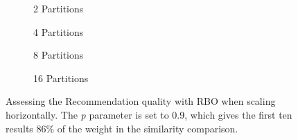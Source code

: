 

\begin{figure}[!htb]
	\centering
	\begin{subfigure}[b]{0.5\linewidth}
	  \centering
	  
	  \caption{2 Partitions} 
	  \label{fig:RBO-horizontall-scaling-2-partitions-a} 
	  \vspace{1cm}
	\end{subfigure}%
	\begin{subfigure}[b]{0.5\linewidth}
	  \centering
	  
	  \caption{4 Partitions} 
	  \label{fig:RBO-horizontall-scaling-4-partitions-b} 
	  \vspace{1cm}
	\end{subfigure} 
	\begin{subfigure}[b]{0.5\linewidth}
	  \centering
	  
	  \caption{8 Partitions} 
	  \label{fig:RBO-horizontall-scaling-8-partitions-c} 
	\end{subfigure}%
	\begin{subfigure}[b]{0.5\linewidth}
	  \centering
	  
	  \caption{16 Partitions} 
	  \label{fig:RBO-horizontall-scaling-16-partitions-d} 
	\end{subfigure} 
	\caption{Assessing the Recommendation quality with RBO when scaling horizontally. The \emph{p} parameter is set to 0.9, which gives the first ten results 86\% of the weight in the similarity comparison.}
	\label{fig:RBO-horizontall-scaling} 
\end{figure}
